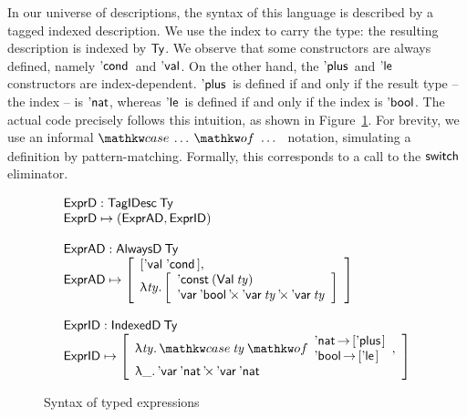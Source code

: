 In our universe of descriptions, the syntax of this language is
described by a tagged indexed description. We use the index to carry
the type: the resulting description is indexed by $\Ty$. We observe
that some constructors are always defined, namely $\Econd{\!}{\!}{\!}$
and $\Eval{\!}$. On the other hand, the $\Eplus{\!}{\!}$ and
$\Ele{\!}{\!}$ constructors are index-dependent. $\Eplus{\!}{\!}$ is
defined if and only if the result type -- the index -- is $\Enat$,
whereas $\Ele{\!}{\!}$ is defined if and only if the index is
$\Ebool$. The actual code precisely follows this intuition, as shown
in Figure~\ref{fig:hexpr-full}. For brevity, we use an informal
$\case{\ldots}{\ldots}$ notation, simulating a definition by
pattern-matching. Formally, this corresponds to a call to the
$\switch{\!}{\!}{\!}{\!}$ eliminator.

\begin{figure}

\[\stk{
\stk{
\HExprD : \TagIDesc{\Ty} \\
\HExprD \mapsto ( \HExprAD , \HExprID ) \\
} \\
\\
\stk{
\HExprAD : \ATagIDesc{\Ty} \\
\HExprAD \mapsto \bigRedBracket{
                 \begin{array}{l}
                   {\sqr{\Eval{\!}\: \Econd{\!}{\!}{\!}\!\,}} \red{,} \\
                   \LAM{\V{ty}}
                   \bigRedBracket{
                   \begin{array}{l}
                   \DConst{(\Val{\V{ty}})} \\
                   \DProd{\DVar{\Ebool}}{\DProd{\DVar{\V{ty}}}{\DVar{\V{ty}}}}
                   \end{array}
                   }
                 \end{array}
                 }
\\
\\
} 
\\
\stk{
\HExprID : \ITagIDesc{\Ty} \\
\HExprID \mapsto \bigRedBracket{
                 \begin{array}{l}
                   \LAM{\V{ty}} \case{\V{ty}}{\Enat \To {\sqr{\Eplus{\!}{\!}\!\,}} \\ \Ebool \To {\sqr{\Ele{\!}{\!}\!\,}}} \red{,} \\
                   \LAM{\_} \DProd{\DVar{\Enat}}{\DVar{\Enat}} 
                   \end{array}
                   }
}
}\]

\caption{Syntax of typed expressions}
\label{fig:hexpr-full}

\end{figure}

